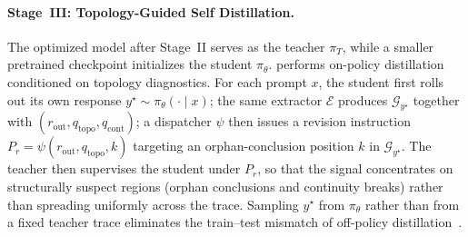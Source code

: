 
\paragraph{Stage~III: Topology-Guided Self Distillation.}
\label{sec:tgsd}
The optimized model after Stage~II serves as the teacher $\pi_T$, while a smaller pretrained checkpoint initializes the student $\pi_\theta$. \framework performs on-policy distillation conditioned on topology diagnostics. For each prompt $x$, the student first rolls out its own response $y^{\star}\!\sim\!\pi_\theta(\cdot\!\mid\!x)$; the same extractor $\mathcal{E}$ produces $\mathcal{G}_{y^{\star}}$ together with $(r_{\mathrm{out}},q_{\mathrm{topo}},q_{\mathrm{cont}})$; a dispatcher $\psi$ then issues a revision instruction $P_r=\psi(r_{\mathrm{out}},q_{\mathrm{topo}},k)$ targeting an orphan-conclusion position $k$ in $\mathcal{G}_{y^{\star}}$. The teacher then supervises the student under $P_r$, so that the signal concentrates on structurally suspect regions (orphan conclusions and continuity breaks) rather than spreading uniformly across the trace. Sampling $y^{\star}$ from $\pi_\theta$ rather than from a fixed teacher trace eliminates the train--test mismatch of off-policy distillation~\citep{agarwal2024gkd,song2026opdsurvey}.


